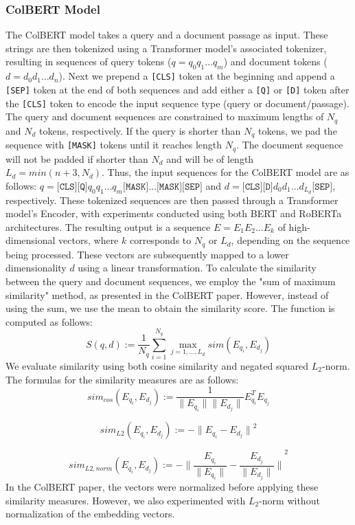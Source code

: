 \documentclass{article}
\begin{document}
\subsubsection{ColBERT Model}
The ColBERT model takes a query and a document passage as input. These strings are then tokenized using a Transformer model's associated tokenizer, resulting in sequences of query tokens ($q = q_0q_1\dots q_m$) and document tokens ($d = d_0d_1\dots d_n$). Next we prepend a \texttt{[CLS]} token at the beginning and append a \texttt{[SEP]} token at the end of both sequences and add either a \texttt{[Q]} or \texttt{[D]} token after the \texttt{[CLS]} token to encode the input sequence type (query or document/passage). The query and document sequences are constrained to maximum lengths of $N_q$ and $N_d$ tokens, respectively. If the query is shorter than $N_q$ tokens, we pad the sequence with \texttt{[MASK]} tokens until it reaches length $N_q$. The document sequence will not be padded if shorter than $N_d$ and will be of length $L_d = min(n + 3, N_d)$. Thus, the input sequences for the ColBERT model are as follows: $q = \texttt{[CLS]}\texttt{[Q]}q_0q_1 \dots q_m\texttt{[MASK]}\dots\texttt{[MASK]}\texttt{[SEP]}$ and $d = \texttt{[CLS]}\texttt{[D]}d_0d_1 \dots d_{L_d}\texttt{[SEP]}$, respectively. These tokenized sequences are then passed through a Transformer model's Encoder, with experiments conducted using both BERT \cite{devlin2019bert} and RoBERTa \cite{liu2019roberta} architectures. The resulting output is a sequence $E = E_1E_2 \dots E_k$ of high-dimensional vectors, where $k$ corresponds to $N_q$ or $L_d$, depending on the sequence being processed. These vectors are subsequently mapped to a lower dimensionality $d$ using a linear transformation. To calculate the similarity between the query and document sequences, we employ the "sum of maximum similarity" method, as presented in the ColBERT paper. However, instead of using the sum, we use the mean to obtain the similarity score. The function is computed as follows:
$$ S(q,d) := \frac{1}{N_q} \sum_{i=1}^{N_q} \max_{j = 1, \dots, L_d} sim(E_{q_i}, E_{d_j})
$$
We evaluate similarity using both cosine similarity and negated squared $L_2$-norm. The formulas for the similarity measures are as follows:
$$
sim_{cos}(E_{q_i}, E_{d_j}) := \frac{1}{\| E_{q_i} \|\| E_{d_j} \|} E_{q_i}^TE_{q_j} 
$$

$$
sim_{L2}(E_{q_i}, E_{d_j}) := -{\| E_{q_i} -E_{d_j} \|}^2
$$

$$
sim_{L2,norm}(E_{q_i}, E_{d_j}) := -{\| \frac{E_{q_i}}{\| E_{q_i} \|}  - \frac{E_{d_j}}{\| E_{d_j} \|} \|}^2
$$
In the ColBERT paper, the vectors were normalized before applying these similarity measures. However, we also experimented with $L_2$-norm without normalization of the embedding vectors.
\end{document}
